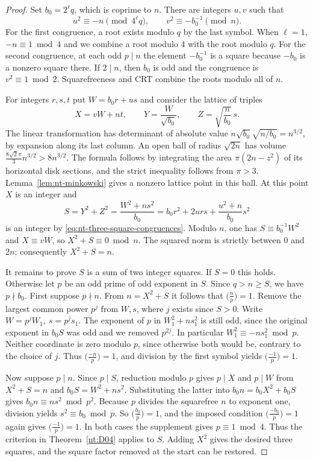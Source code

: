 \documentclass[11pt,oneside,openany]{book}
\theoremstyle{plain}
\theoremstyle{definition}
\theoremstyle{remark}
\begin{document}
\begin{proof}
Set \(b_0=2^\ell q\), which is coprime to \(n\). There are integers
\(u,v\) such that
\begin{equation}\label{eq:nt-three-square-congruences}
 u^2\equiv-n\pmod{4^\ell q},\qquad
 v^2\equiv-b_0^{-1}\pmod n .
\end{equation}
For the first congruence, a root exists modulo \(q\) by the last
symbol. When \(\ell=1\), \(-n\equiv1\bmod4\) and we combine a root
modulo \(4\) with the root modulo \(q\). For the second congruence,
at each odd \(p\mid n\) the element \(-b_0^{-1}\) is a square
because \(-b_0\) is a nonzero square there. If \(2\mid n\), then
\(b_0\) is odd and the congruence is \(v^2\equiv1\bmod2\).
Squarefreeness and CRT combine the roots modulo all of \(n\).

For integers \(r,s,t\) put \(W=b_0r+us\) and consider the lattice
of triples
\[
 X=vW+nt,\qquad Y=\frac{W}{\sqrt{b_0}},\qquad
 Z=\sqrt{\frac n{b_0}}\,s .
\]
The linear transformation has determinant of absolute value
\(n\sqrt{b_0}\sqrt{n/b_0}=n^{3/2}\), by expansion along its last
column. An open ball of radius \(\sqrt{2n}\) has volume
\(\frac{8\sqrt2\pi}{3}n^{3/2}>8n^{3/2}\). The formula follows by
integrating the area \(\pi(2n-z^2)\) of its horizontal disk
sections, and the strict inequality follows from \(\pi>3\).
Lemma~\ref{lem:nt-minkowski} gives a nonzero lattice point in this
ball. At this point \(X\) is an integer and
\[
 S=Y^2+Z^2
  =\frac{W^2+ns^2}{b_0}
  =b_0r^2+2urs+\frac{u^2+n}{b_0}s^2
\]
is an integer by \eqref{eq:nt-three-square-congruences}.
Modulo \(n\), one has \(S\equiv b_0^{-1}W^2\) and
\(X\equiv vW\), so \(X^2+S\equiv0\bmod n\).
The squared norm is strictly between \(0\) and \(2n\);
consequently \(X^2+S=n\).

It remains to prove \(S\) is a sum of two integer squares. If
\(S=0\) this holds. Otherwise let \(p\) be an odd prime of odd
exponent in \(S\). Since \(q>n\ge S\), we have \(p\nmid b_0\).
First suppose \(p\nmid n\). From \(n=X^2+S\) it follows that
\(\bigl(\frac n p\bigr)=1\). Remove the largest common power \(p^j\)
from \(W,s\), where \(j\) exists since \(S>0\). Write
\(W=p^j W_1,\ s=p^j s_1\). The exponent of \(p\) in
\(W_1^2+ns_1^2\) is still odd, since the original exponent in
\(b_0S\) was odd and we removed \(p^{2j}\). In particular
\(W_1^2\equiv-ns_1^2\bmod p\). Neither coordinate is zero modulo
\(p\), since otherwise both would be, contrary to the choice of \(j\).
Thus \(\bigl(\frac{-n}{p}\bigr)=1\), and division by the first
symbol yields \(\bigl(\frac{-1}{p}\bigr)=1\).

Now suppose \(p\mid n\). Since \(p\mid S\), reduction modulo \(p\) gives \(p\mid X\)
and \(p\mid W\) from \(X^2+S=n\) and \(b_0 S=W^2+ns^2\).
Substituting the latter into \(b_0n=b_0X^2+b_0S\) gives
\(b_0n\equiv ns^2\bmod p^2\). Because \(p\) divides the squarefree
\(n\) to exponent one, division yields \(s^2\equiv b_0\bmod p\).
So \(\bigl(\frac{b_0}{p}\bigr)=1\), and the imposed condition
\(\bigl(\frac{-b_0}{p}\bigr)=1\) again gives
\(\bigl(\frac{-1}{p}\bigr)=1\).
In both cases the supplement gives \(p\equiv1\bmod4\). Thus the
criterion in Theorem~\ref{nt:D04} applies to \(S\). Adding \(X^2\)
gives the desired three squares, and the square factor removed at
the start can be restored.
\end{proof}
\end{document}

